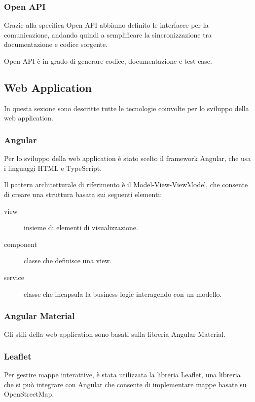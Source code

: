 \documentclass[../manuale-sviluppatore.tex]{subfiles}
\begin{document}
\subsubsection{Open API}%
\label{sub:open_api}
Grazie alla specifica Open API abbiamo definito le interfacce per la comunicazione, andando quindi a semplificare la sincronizzazione tra documentazione e codice sorgente.

Open API è in grado di generare codice, documentazione e test case.
\newpage


\subsection{Web Application}%
\label{sub:web_app}
In questa sezione sono descritte tutte le tecnologie coinvolte per lo sviluppo della web application.


\subsubsection{Angular}%
\label{subs:angular}

Per lo sviluppo della web application è stato scelto il framework Angular, che usa i linguaggi HTML e TypeScript.

Il pattern architetturale di riferimento è il Model-View-ViewModel, che consente di creare una struttura basata sui seguenti elementi:
\begin{description}
    \item[view] insieme di elementi di visualizzazione.
    \item[component] classe che definisce una view.
    \item[service] classe che incapsula la business logic interagendo con un modello.   
\end{description}

\subsubsection{Angular Material}%
\label{subs:angular}

Gli stili della web application sono basati sulla libreria Angular Material.

\subsubsection{Leaflet}%
\label{subs:angular}

Per gestire mappe interattive, è stata utilizzata la libreria Leaflet, una libreria che si può integrare con Angular che consente di implementare mappe basate su OpenStreetMap.
\end{document}
